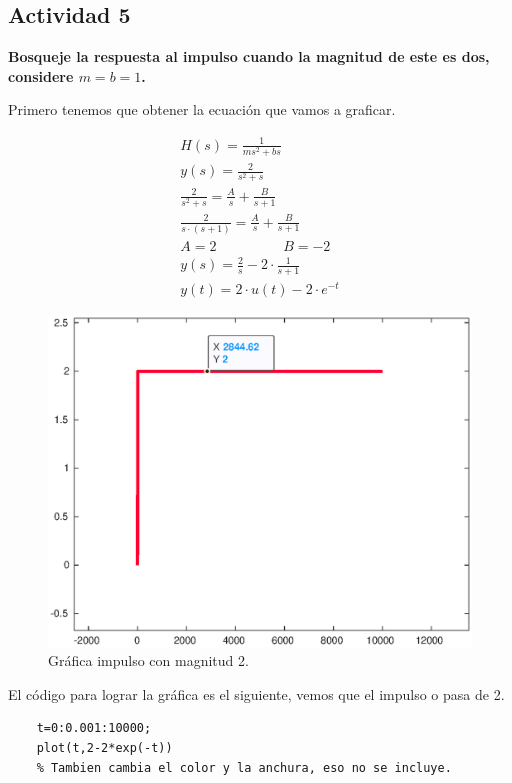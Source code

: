 	
\subsection{Actividad 5}
\textbf{Bosqueje la respuesta al impulso cuando la magnitud de este es dos, considere $ m = b = 1 $.}

Primero tenemos que obtener la ecuación que vamos a graficar.

\begin{align}
	H(s) = \frac{1}{ms^2+bs} \\
	y(s)=\frac{2}{s^2+s} \\
	\frac{2}{s^2+s}=\frac{A}{s} + \frac{B}{s+1} \\
	\frac{2}{s \cdot (s+1)} = \frac{A}{s} + \frac{B}{s+1} \\
	A=2 \hspace{2cm} B=-2 \\
	y(s)=\frac{2}{s}-2 \cdot \frac{1}{s+1}\\
	y(t)=2 \cdot u(t) - 2 \cdot e^{-t}
\end{align}

\begin{figure}[H]
	\centering
	\includegraphics[scale=0.7]{img/act_5}
	\caption{Gráfica impulso con magnitud 2.}
	\label{fig:act5}
\end{figure}

El código para lograr la gráfica es el siguiente, vemos que el impulso o pasa de 2.

\begin{lstlisting}
	t=0:0.001:10000;
	plot(t,2-2*exp(-t))
	% Tambien cambia el color y la anchura, eso no se incluye.
\end{lstlisting}


